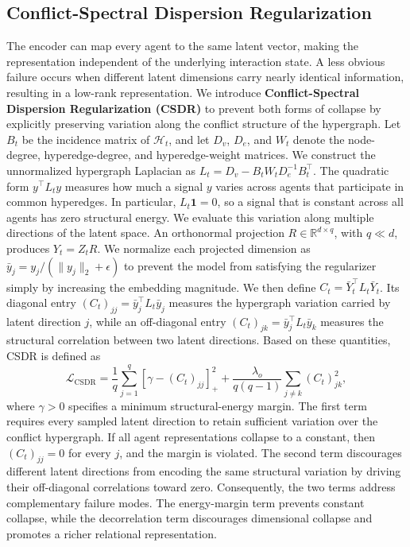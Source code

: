 \documentclass{article} %
\begin{document}
\subsection{Conflict-Spectral Dispersion Regularization} \label{sec:csdr}  The encoder can map every agent to the same latent vector, making the representation independent of the underlying interaction state. A less obvious failure occurs when different latent dimensions carry nearly identical information, resulting in a low-rank representation. We introduce \textbf{Conflict-Spectral Dispersion Regularization (CSDR)} to prevent both forms of collapse by explicitly preserving variation along the conflict structure of the hypergraph. Let $B_t$ be the incidence matrix of $\mathcal{H}_t$, and let $D_v$, $D_e$, and $W_t$ denote the node-degree, hyperedge-degree, and hyperedge-weight matrices. We construct the unnormalized hypergraph Laplacian as $L_t=D_v-B_tW_tD_e^{-1}B_t^\top$. The quadratic form $y^\top L_t y$ measures how much a signal $y$ varies across agents that participate in common hyperedges. In particular, $L_t\mathbf{1}=0$, so a signal that is constant across all agents has zero structural energy. We evaluate this variation along multiple directions of the latent space. An orthonormal projection $R\in\mathbb{R}^{d\times q}$, with $q\ll d$, produces $Y_t=Z_tR$. We normalize each projected dimension as $\bar y_j=y_j/(\|y_j\|_2+\epsilon)$ to prevent the model from satisfying the regularizer simply by increasing the embedding magnitude. We then define $C_t=\bar Y_t^\top L_t\bar Y_t$. Its diagonal entry $(C_t)_{jj}=\bar y_j^\top L_t\bar y_j$ measures the hypergraph variation carried by latent direction $j$, while an off-diagonal entry $(C_t)_{jk}=\bar y_j^\top L_t\bar y_k$ measures the structural correlation between two latent directions. Based on these quantities, CSDR is defined as \begin{equation} \mathcal{L}_{\mathrm{CSDR}} = \frac{1}{q}\sum_{j=1}^{q} [\gamma-(C_t)_{jj}]_+^2 + \frac{\lambda_o}{q(q-1)} \sum_{j\neq k}(C_t)_{jk}^{2}, \label{eq:csdr} \end{equation} where $\gamma>0$ specifies a minimum structural-energy margin. The first term requires every sampled latent direction to retain sufficient variation over the conflict hypergraph. If all agent representations collapse to a constant, then $(C_t)_{jj}=0$ for every $j$, and the margin is violated. The second term discourages different latent directions from encoding the same structural variation by driving their off-diagonal correlations toward zero. Consequently, the two terms address complementary failure modes. The energy-margin term prevents constant collapse, while the decorrelation term discourages dimensional collapse and promotes a richer relational representation. 
\end{document}
